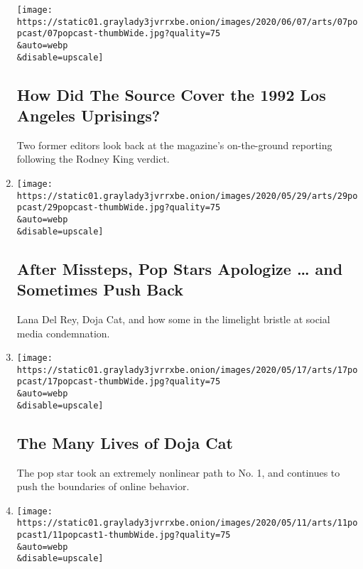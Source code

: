 \begin{enumerate}
  \texttt{[image: https://static01.graylady3jvrrxbe.onion/images/2020/06/07/arts/07popcast/07popcast-thumbWide.jpg?quality=75\\\&auto=webp\\\&disable=upscale]}

  \hypertarget{how-did-the-source-cover-the-1992-los-angeles-uprisings}{%
  \subsection{How Did The Source Cover the 1992 Los Angeles
  Uprisings?}\label{how-did-the-source-cover-the-1992-los-angeles-uprisings}}

  Two former editors look back at the magazine's on-the-ground reporting
  following the Rodney King verdict.
\item
  \href{/2020/06/01/arts/music/popcast-lana-del-rey-doja-cat-apologies.html}{}

  \texttt{[image: https://static01.graylady3jvrrxbe.onion/images/2020/05/29/arts/29popcast/29popcast-thumbWide.jpg?quality=75\\\&auto=webp\\\&disable=upscale]}

  \hypertarget{after-missteps-pop-stars-apologize--and-sometimes-push-back}{%
  \subsection{After Missteps, Pop Stars Apologize \ldots{} and Sometimes
  Push
  Back}\label{after-missteps-pop-stars-apologize--and-sometimes-push-back}}

  Lana Del Rey, Doja Cat, and how some in the limelight bristle at
  social media condemnation.
\item
  \href{/2020/05/18/arts/music/popcast-doja-cat.html}{}

  \texttt{[image: https://static01.graylady3jvrrxbe.onion/images/2020/05/17/arts/17popcast/17popcast-thumbWide.jpg?quality=75\\\&auto=webp\\\&disable=upscale]}

  \hypertarget{the-many-lives-of-doja-cat}{%
  \subsection{The Many Lives of Doja
  Cat}\label{the-many-lives-of-doja-cat}}

  The pop star took an extremely nonlinear path to No. 1, and continues
  to push the boundaries of online behavior.
\item
  \href{/2020/05/11/arts/music/popcast-tony-allen-florian-schneider.html}{}

  \texttt{[image: https://static01.graylady3jvrrxbe.onion/images/2020/05/11/arts/11popcast1/11popcast1-thumbWide.jpg?quality=75\\\&auto=webp\\\&disable=upscale]}


\end{enumerate}
